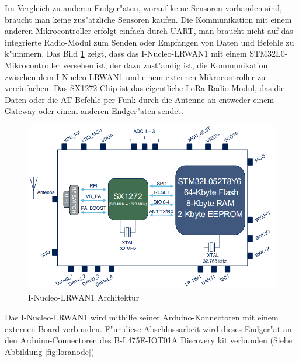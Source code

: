 Im Vergleich zu anderen Endger"aten, worauf keine Sensoren vorhanden 
sind, braucht man keine zus"atzliche Sensoren kaufen. Die 
Kommunikation mit einem anderen Mikrocontroller erfolgt einfach durch 
UART, man braucht nicht auf das integrierte Radio-Modul zum Senden oder 
Empfangen von Daten und Befehle zu k"ummern. Das Bild 
\ref{fig:loraMod_intern} zeigt, dass das I-Nucleo-LRWAN1 mit einem 
STM32L0-Mikrocontroller versehen ist, der dazu zust"andig ist, die 
Kommunikation zwischen dem I-Nucleo-LRWAN1 und einem externen 
Mikrocontroller zu vereinfachen. Das SX1272-Chip ist das eigentliche 
LoRa-Radio-Modul, das die Daten oder die AT-Befehle per Funk durch die 
Antenne an entweder einem Gateway oder einem anderen Endger"aten 
sendet. 

\begin{figure}[h]
	\centering
	\includegraphics[width=14cm]{source/images/LoRa_Intern}
	\caption{I-Nucleo-LRWAN1 Architektur 
	\cite{LoRaMod}\label{fig:loraMod_intern}}
\end{figure}

\vspace{10cm}
Das I-Nucleo-LRWAN1 wird mithilfe seiner Arduino-Konnectoren mit einem 
externen Board verbunden. F"ur diese Abschlussarbeit wird dieses 
Endger"at an den Arduino-Connectoren des B-L475E-IOT01A Discovery kit 
verbunden (Siehe Abbildung \ref{fig:loranode})

